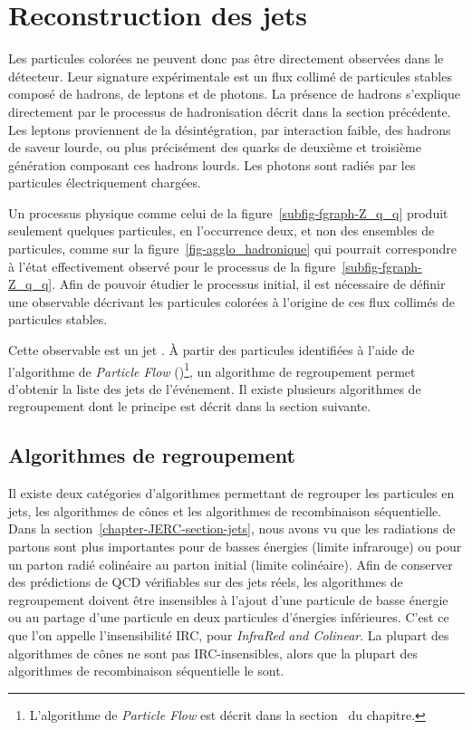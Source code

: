 \section{Reconstruction des jets}\label{chapter-JERC-section-jets_reco}
Les particules colorées ne peuvent donc pas être directement observées dans le détecteur.
Leur signature expérimentale est un flux collimé de particules stables composé de hadrons, de leptons et de photons.
La présence de hadrons s'explique directement par le processus de hadronisation décrit dans la section précédente.
Les leptons proviennent de la désintégration, par interaction faible, des hadrons de saveur lourde, ou plus précisément des quarks de deuxième et troisième génération composant ces hadrons lourds.
Les photons sont radiés par les particules électriquement chargées.
\par Un processus physique comme celui de la figure~\ref{subfig-fgraph-Z_q_q} produit seulement quelques particules, en l'occurrence deux, et non des ensembles de particules, comme sur la figure~\ref{fig-agglo_hadronique} qui pourrait correspondre à l'état effectivement observé pour le processus de la figure~\ref{subfig-fgraph-Z_q_q}.
Afin de pouvoir étudier le processus initial, il est nécessaire de définir une observable décrivant les particules colorées à l'origine de ces flux collimés de particules stables.
\par Cette observable est un \og jet \fg.
À partir des particules identifiées à l'aide de l'algorithme de \emph{Particle Flow} (\PF)\footnote{L'algorithme de \emph{Particle Flow} est décrit dans la section~ du chapitre.}, un algorithme de regroupement permet d'obtenir la liste des jets de l'événement.
Il existe plusieurs algorithmes de regroupement dont le principe est décrit dans la section suivante.
\subsection{Algorithmes de regroupement}\label{chapter-JERC-section-jets_reco-subsec-algo}
Il existe deux catégories d'algorithmes permettant de regrouper les particules en jets, les algorithmes de cônes et les algorithmes de recombinaison séquentielle.
Dans la section~\ref{chapter-JERC-section-jets}, nous avons vu que les radiations de partons sont plus importantes pour de basses énergies (limite infrarouge) ou pour un parton radié colinéaire au parton initial (limite colinéaire).
Afin de conserver des prédictions de QCD vérifiables sur des jets réels, les algorithmes de regroupement doivent être insensibles à l'ajout d'une particule de basse énergie ou au partage d'une particule en deux particules d'énergies inférieures. C'est ce que l'on appelle l'insensibilité IRC, pour \emph{InfraRed and Colinear}.
La plupart des algorithmes de cônes ne sont pas IRC-insensibles, alors que la plupart des algorithmes de recombinaison séquentielle le sont.
